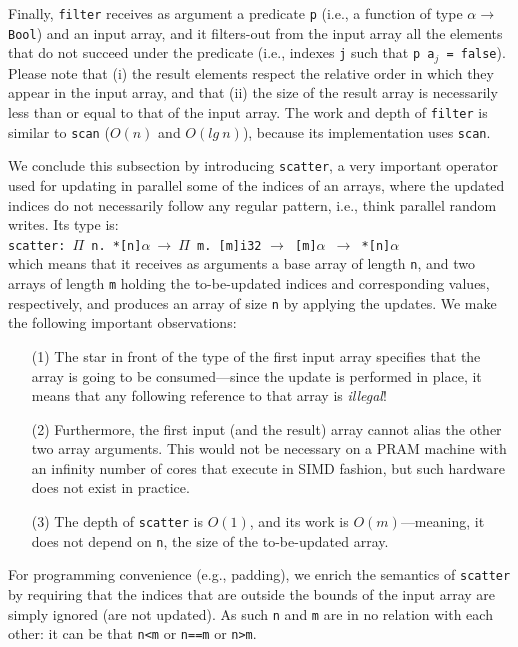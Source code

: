 \documentclass[acmsmall,review]{acmart}\settopmatter{printfolios=true,printccs=false,printacmref=false}
\begin{document}
Finally, \lstinline{filter} receives as argument a predicate {\tt p} 
(i.e., a function of type $\alpha\to${\tt{}Bool}) and an input array,
and it filters-out from the input array all the elements that do not
succeed under the predicate (i.e., indexes {\tt j} such that 
{\tt p a$_j$ = }\lstinline{false}). Please note that (i) the result
elements respect the relative order in which they appear in the input
array, and that (ii) the size of the result array is necessarily 
less than or equal to that of the input array. The work and depth
of \lstinline{filter} is similar to \lstinline{scan} 
($O(n)$ and $O(lg~n)$), because its implementation uses \lstinline{scan}. 

We conclude this subsection by introducing \lstinline{scatter},
a very important operator used for updating in parallel some of 
the indices of an arrays, where the updated indices do not necessarily
follow any regular pattern, i.e., think parallel random writes.
Its type is:\\
\lstinline{scatter}{\tt : $\Pi$ n. *[n]$\alpha~\to~\Pi$ m. [m]}\lstinline{i32}
{\tt$\to$ [m]$\alpha$ $\to$ *[n]$\alpha$}\\
which means that it receives as arguments a base array of length {\tt n},
and two arrays of length {\tt m} holding the to-be-updated
indices and corresponding values, respectively, and produces an array
of size {\tt n} by applying the updates. We make the following
important observations:
\begin{itemize}
    \item[(1)] The star {\tt *} in front of the type of the first input 
        array specifies that the array is going to be consumed---since
        the update is performed in place, it means that any following 
        reference to that array is \emph{illegal}! 
    \item[(2)] Furthermore, the first input (and the result) array cannot 
        alias the other two 
        array arguments. This would not be necessary on a PRAM machine
        with an infinity number of cores that execute in SIMD fashion,
        but such hardware does not exist in practice.
    \item[(3)] The depth of \lstinline{scatter} is $O(1)$, and its work is 
        $O(m)$---meaning, it does not depend on {\tt n}, the size of 
        the to-be-updated array.
\end{itemize}
For programming convenience (e.g., padding), we enrich the semantics
of \lstinline{scatter} by requiring that the indices that are 
outside the bounds of the input array are simply ignored (are not
updated). As such {\tt n} and {\tt m} are in no relation with
each other: it can be that {\tt n<m} or {\tt n==m} or {\tt n>m}. 
\end{document}
